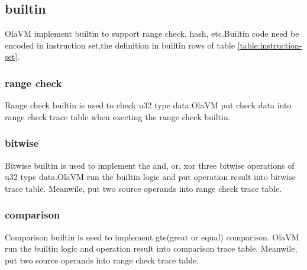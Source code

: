 \subsection{builtin}\label{subsec: instructions-builtin}
OlaVM implement builtin to support range check, hash, etc.Builtin code need be encoded in instruction set,the definition in builtin rows of table \ref{table:instruction-set}.

\subsubsection{range check}
Range check builtin is used to check u32 type data.OlaVM put check data into range check trace table when execting the range check builtin.

\subsubsection{bitwise}
Bitwise builtin is used to implement the and, or, xor three bitwise operations of u32 type data.OlaVM run the builtin logic and put operation result into bitwise trace table.
Meanwile, put two source operands into range check trace table.

\subsubsection{comparison}
Comparison builtin is used to implement gte(great or equal) comparison. OlaVM run the builtin logic and operation result into comparison trace table.
Meanwile, put two source operands into range check trace table.